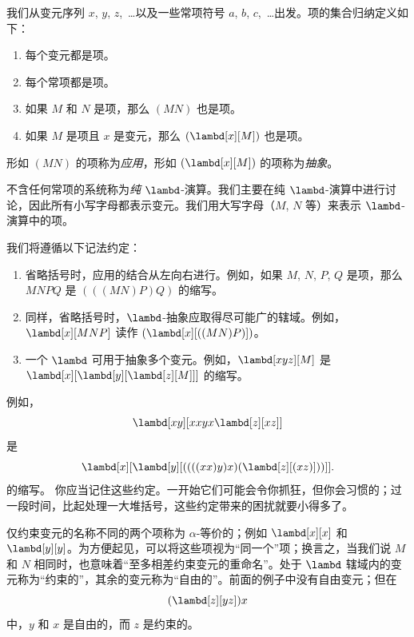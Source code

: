 \documentclass[../../../include/open-logic-section]{subfiles}
\begin{document}

我们从变元序列 $x$, $y$, $z$,~\dots 以及一些常项符号 $a$, $b$, $c$,~\dots 出发。项的集合归纳定义如下：
\begin{enumerate}
\item 每个变元都是项。
\item 每个常项都是项。
\item 如果 $M$ 和 $N$ 是项，那么 $(MN)$ 也是项。
\item 如果 $M$ 是项且 $x$ 是变元，那么 $(\lambd[x][M])$ 也是项。
\end{enumerate}

形如 $(MN)$ 的项称为\emph{应用}，形如 $(\lambd[x][M])$ 的项称为\emph{抽象}。

不含任何常项的系统称为\emph{纯} $\lambd$-演算。我们主要在纯 $\lambd$-演算中进行讨论，因此所有小写字母都表示变元。我们用大写字母（$M$, $N$ 等）来表示 $\lambd$-演算中的项。

我们将遵循以下记法约定：

\begin{conv}
\begin{enumerate}
\item 省略括号时，应用的结合从左向右进行。例如，如果 $M$, $N$, $P$, $Q$ 是项，那么 $MNPQ$ 是 $(((MN)P)Q)$ 的缩写。
\item 同样，省略括号时，$\lambd$-抽象应取得尽可能广的辖域。例如，$\lambd[x][MNP]$ 读作 $(\lambd[x][((MN)P)])$。
\item 一个 $\lambd$ 可用于抽象多个变元。例如，$\lambd[xyz][M]$ 是 $\lambd[x][\lambd[y][\lambd[z][M]]]$ 的缩写。
\end{enumerate}
\end{conv}

例如，
\[
\lambd[xy][xxyx \lambd[z][xz]]
\]
是
\[
\lambd[x][\lambd[y][((((xx)y)x)(\lambd[z][(xz)]))]].
\]
的缩写。
你应当记住这些约定。一开始它们可能会令你抓狂，但你会习惯的；过一段时间，比起处理一大堆括号，这些约定带来的困扰就要小得多了。

仅约束变元的名称不同的两个项称为 $\alpha$-等价的；例如 $\lambd[x][x]$ 和 $\lambd[y][y]$。为方便起见，可以将这些项视为“同一个”项；换言之，当我们说 $M$ 和 $N$ 相同时，也意味着“至多相差约束变元的重命名”。处于 $\lambd$ 辖域内的变元称为“约束的”，其余的变元称为“自由的”。前面的例子中没有自由变元；但在
\[
(\lambd[z][yz])x
\]
中，$y$ 和 $x$ 是自由的，而 $z$ 是约束的。
\end{document}
